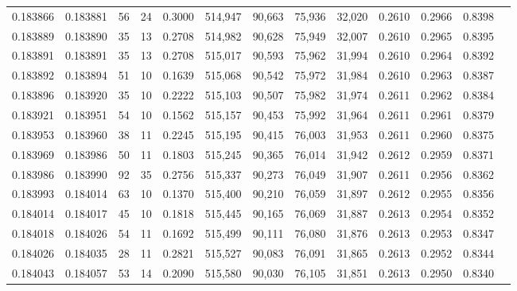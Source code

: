 \begin{tabular}{rrrrrrrrrrrrr}
0.183866 & 0.183881 &    56 &  24 &                                     0.3000 & 514,947 &  90,663 &  75,936 &  32,020 & 0.2610 & 0.2966 & 0.8398 \\
0.183889 & 0.183890 &    35 &  13 &                                     0.2708 & 514,982 &  90,628 &  75,949 &  32,007 & 0.2610 & 0.2965 & 0.8395 \\
0.183891 & 0.183891 &    35 &  13 &                                     0.2708 & 515,017 &  90,593 &  75,962 &  31,994 & 0.2610 & 0.2964 & 0.8392 \\
0.183892 & 0.183894 &    51 &  10 &                                     0.1639 & 515,068 &  90,542 &  75,972 &  31,984 & 0.2610 & 0.2963 & 0.8387 \\
0.183896 & 0.183920 &    35 &  10 &                                     0.2222 & 515,103 &  90,507 &  75,982 &  31,974 & 0.2611 & 0.2962 & 0.8384 \\
0.183921 & 0.183951 &    54 &  10 &                                     0.1562 & 515,157 &  90,453 &  75,992 &  31,964 & 0.2611 & 0.2961 & 0.8379 \\
0.183953 & 0.183960 &    38 &  11 &                                     0.2245 & 515,195 &  90,415 &  76,003 &  31,953 & 0.2611 & 0.2960 & 0.8375 \\
0.183969 & 0.183986 &    50 &  11 &                                     0.1803 & 515,245 &  90,365 &  76,014 &  31,942 & 0.2612 & 0.2959 & 0.8371 \\
0.183986 & 0.183990 &    92 &  35 &                                     0.2756 & 515,337 &  90,273 &  76,049 &  31,907 & 0.2611 & 0.2956 & 0.8362 \\
0.183993 & 0.184014 &    63 &  10 &                                     0.1370 & 515,400 &  90,210 &  76,059 &  31,897 & 0.2612 & 0.2955 & 0.8356 \\
0.184014 & 0.184017 &    45 &  10 &                                     0.1818 & 515,445 &  90,165 &  76,069 &  31,887 & 0.2613 & 0.2954 & 0.8352 \\
0.184018 & 0.184026 &    54 &  11 &                                     0.1692 & 515,499 &  90,111 &  76,080 &  31,876 & 0.2613 & 0.2953 & 0.8347 \\
0.184026 & 0.184035 &    28 &  11 &                                     0.2821 & 515,527 &  90,083 &  76,091 &  31,865 & 0.2613 & 0.2952 & 0.8344 \\
0.184043 & 0.184057 &    53 &  14 &                                     0.2090 & 515,580 &  90,030 &  76,105 &  31,851 & 0.2613 & 0.2950 & 0.8340 \\

\end{tabular}
